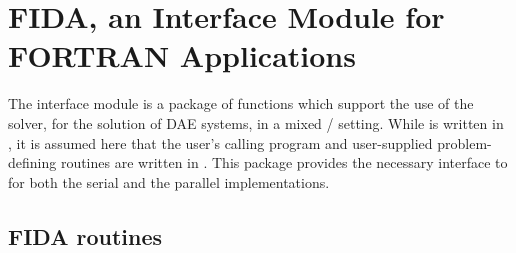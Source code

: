 \chapter{FIDA, an Interface Module for FORTRAN Applications}\label{s:fcmix}

The {\fida} interface module is a package of {\C} functions which support
the use of the {\ida} solver, for the solution of DAE systems, in a mixed
{\F}/{\C} setting.  While {\ida} is written in {\C}, it is assumed here
that the user's calling program and user-supplied problem-defining routines
are written in {\F}. This package provides the necessary interface to {\ida}
for both the serial and the parallel {\nvector} implementations.

\section{FIDA routines}\label{sss:fidaroutines}

